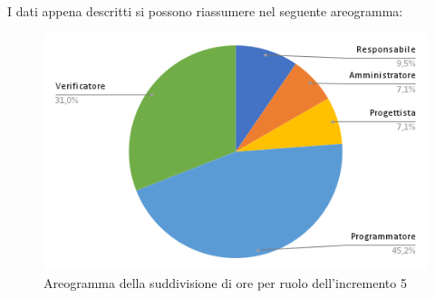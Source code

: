 \pagebreak
I dati appena descritti si possono riassumere nel seguente areogramma:
\begin{figure}[!h]
    \vspace{5px}
    \includegraphics[scale=0.5]{../../../Images/Diagrammi/Diagramma a torta/areogrammaIncremento10.png}
    \centering
    \caption{Areogramma della suddivisione di ore per ruolo dell'incremento 5}
\end{figure}

